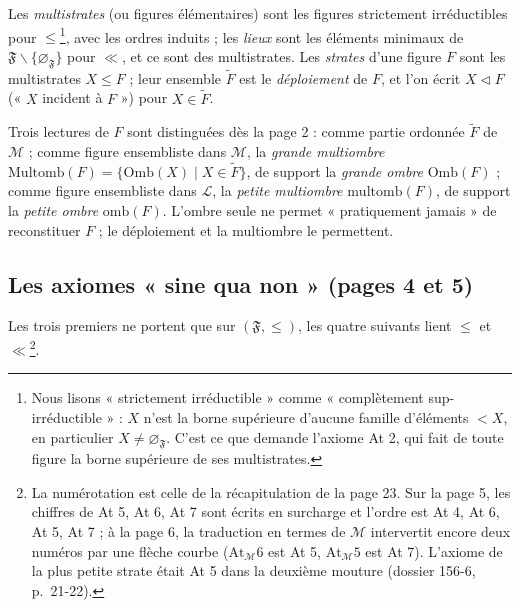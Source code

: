\documentclass[11pt,a4paper]{article}
\begin{document}
Les \emph{multistrates} (ou figures élémentaires) sont les figures strictement
irréductibles pour $\leq$\footnote{Nous lisons « strictement irréductible »
comme « complètement sup-irréductible » : $X$ n'est la borne supérieure d'aucune
famille d'éléments $< X$, en particulier $X \neq \varnothing_{\mathfrak{F}}$.
C'est ce que demande l'axiome At 2, qui fait de toute figure la borne supérieure
de ses multistrates.}, avec les ordres induits ; les \emph{lieux} sont les
éléments minimaux de $\mathfrak{F} \smallsetminus \{\varnothing_{\mathfrak{F}}\}$
pour $\ll$, et ce sont des multistrates. Les \emph{strates} d'une figure $F$
sont les multistrates $X \leq F$ ; leur ensemble $\widetilde{F}$ est le
\emph{déploiement} de $F$, et l'on écrit $X \triangleleft F$ (« $X$ incident à
$F$ ») pour $X \in \widetilde{F}$.

Trois lectures de $F$ sont distinguées dès la page 2 : comme partie ordonnée
$\widetilde{F}$ de $\mathcal{M}$ ; comme figure ensembliste dans $\mathcal{M}$,
la \emph{grande multiombre} $\mathrm{Multomb}(F) = \{\mathrm{Omb}(X) \mid X \in
\widetilde{F}\}$, de support la \emph{grande ombre} $\mathrm{Omb}(F)$ ; comme
figure ensembliste dans $\mathcal{L}$, la \emph{petite multiombre}
$\mathrm{multomb}(F)$, de support la \emph{petite ombre} $\mathrm{omb}(F)$.
L'ombre seule ne permet « pratiquement jamais » de reconstituer $F$ ; le
déploiement et la multiombre le permettent.

\subsection*{Les axiomes « sine qua non » (pages 4 et 5)}

Les trois premiers ne portent que sur $(\mathfrak{F}, \leq)$, les quatre suivants
lient $\leq$ et $\ll$\footnote{La numérotation est celle de la récapitulation de
la page 23. Sur la page 5, les chiffres de At 5, At 6, At 7 sont écrits en
surcharge et l'ordre est At 4, At 6, At 5, At 7 ; à la page 6, la traduction en
termes de $\mathcal{M}$ intervertit encore deux numéros par une flèche courbe
($\mathrm{At}_{\mathcal{M}} 6$ est At 5, $\mathrm{At}_{\mathcal{M}} 5$ est At 7).
L'axiome de la plus petite strate était At 5 dans la deuxième mouture (dossier
156-6, p.~21-22).}.
\end{document}
